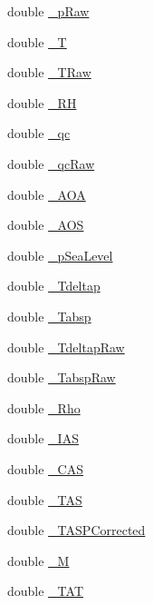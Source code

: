 \begin{DoxyCompactItemize}
\item 
double \hyperlink{class_air_d_c_a0a27dd9c1310d80cc6fcd2a7206118e9}{\+\_\+p\+Raw}
\item 
double \hyperlink{class_air_d_c_ab6f890ee32ce1516ab4be2df5fc87512}{\+\_\+T}
\item 
double \hyperlink{class_air_d_c_a74c3becfb2567c4e5160462640464751}{\+\_\+\+T\+Raw}
\item 
double \hyperlink{class_air_d_c_a97e285a95da76399ef1b80d317304b08}{\+\_\+\+RH}
\item 
double \hyperlink{class_air_d_c_a1b24442b698f10a05b0f577cd29b2354}{\+\_\+qc}
\item 
double \hyperlink{class_air_d_c_a0230a9cb98053c272cbe4c759fb944a7}{\+\_\+qc\+Raw}
\item 
double \hyperlink{class_air_d_c_acffb07b44db4ac59865794b08166c076}{\+\_\+\+A\+OA}
\item 
double \hyperlink{class_air_d_c_a7a5ce65539837a96aea6ab27cc17805d}{\+\_\+\+A\+OS}
\item 
double \hyperlink{class_air_d_c_ae41c7ac96a56dfa11e23e4379f7126ee}{\+\_\+p\+Sea\+Level}
\item 
double \hyperlink{class_air_d_c_a35325b7c2689999015d1154711a4f4a8}{\+\_\+\+Tdeltap}
\item 
double \hyperlink{class_air_d_c_a9c0b07d8083b020b1bdc1b47b404d880}{\+\_\+\+Tabsp}
\item 
double \hyperlink{class_air_d_c_a01ef7b186b768452c9190e8d8c3d83d2}{\+\_\+\+Tdeltap\+Raw}
\item 
double \hyperlink{class_air_d_c_afe68f1ec8ccf7e83703cf14bfdd7671e}{\+\_\+\+Tabsp\+Raw}
\item 
double \hyperlink{class_air_d_c_a8ab31dfd4935d323247fc826056484cc}{\+\_\+\+Rho}
\item 
double \hyperlink{class_air_d_c_aa9009f1bc3acbff291ea74a16793925d}{\+\_\+\+I\+AS}
\item 
double \hyperlink{class_air_d_c_a3edeb2c3414928678ae4783390fbdcc2}{\+\_\+\+C\+AS}
\item 
double \hyperlink{class_air_d_c_acb03122240267d351311838467da7626}{\+\_\+\+T\+AS}
\item 
double \hyperlink{class_air_d_c_a98626ba90fef24d18f0ab1c6ff48c8f9}{\+\_\+\+T\+A\+S\+P\+Corrected}
\item 
double \hyperlink{class_air_d_c_a64c61411ff1046d4208729fd60843fcf}{\+\_\+M}
\item 
double \hyperlink{class_air_d_c_a0906212640e0c8b3aa1fde142defe528}{\+\_\+\+T\+AT}
\item 

\end{DoxyCompactItemize}
